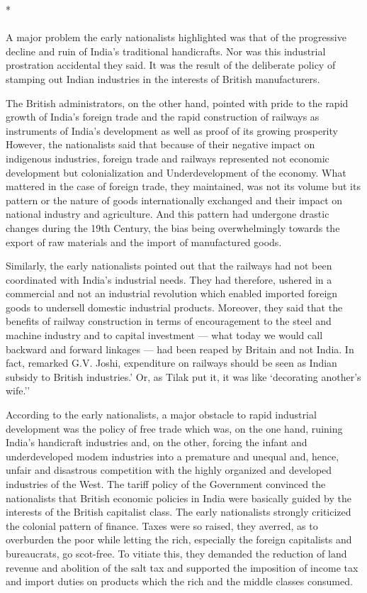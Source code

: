 \begin{center}*\end{center}

\paragraph*{}


A major problem the early nationalists highlighted was that of the progressive decline and ruin of India's traditional handicrafts. Nor was this industrial prostration accidental they said. It was the result of the deliberate policy of stamping out Indian industries in the interests of British manufacturers.

The British administrators, on the other hand, pointed with pride to the rapid growth of India's foreign trade and the rapid construction of railways as instruments of India's development as well as proof of its growing prosperity However, the nationalists said that because of their negative impact on indigenous industries, foreign trade and railways represented not economic development but colonialization and Underdevelopment of the economy. What mattered in the case of foreign trade, they maintained, was not its volume but its pattern or the nature of goods internationally exchanged and their impact on national industry and agriculture. And this pattern had undergone drastic changes during the 19th Century, the bias being overwhelmingly towards the export of raw materials and the import of manufactured goods.

Similarly, the early nationalists pointed out that the railways had not been coordinated with India's industrial needs. They had therefore, ushered in a commercial and not an industrial revolution which enabled imported foreign goods to undersell domestic industrial products. Moreover, they said that the benefits of railway construction in terms of encouragement to the steel and machine industry and to capital investment — what today we would call backward and forward linkages — had been reaped by Britain and not India. In fact, remarked G.V. Joshi, expenditure on railways should be seen as Indian subsidy to British industries.' Or, as Tilak put it, it was like `decorating another's wife.''

According to the early nationalists, a major obstacle to rapid industrial development was the policy of free trade which was, on the one hand, ruining India's handicraft industries and, on the other, forcing the infant and underdeveloped modem industries into a premature and unequal and, hence, unfair and disastrous competition with the highly organized and developed industries of the West. The tariff policy of the Government convinced the nationalists that British economic policies in India were basically guided by the interests of the British capitalist class. The early nationalists strongly criticized the colonial pattern of finance. Taxes were so raised, they averred, as to overburden the poor while letting the rich, especially the foreign capitalists and bureaucrats, go scot-free. To vitiate this, they demanded the reduction of land revenue and abolition of the salt tax and supported the imposition of income tax and import duties on products which the rich and the middle classes consumed.

